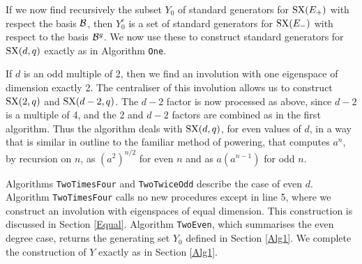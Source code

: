 \documentclass[12pt]{article}
\def\SX{{\rm SX}}
\begin{document}
If we now find recursively the subset $Y_0$ of
standard generators for $\SX(E_+)$ with respect the basis $\cal B$,
then $Y_0^c$ is a set of standard generators for $\SX(E_-)$ with
respect to the basis ${\cal B}^g$. We now use these 
to construct standard generators for 
$\SX(d,q)$ exactly as in Algorithm {\tt One}.

If $d$ is an odd multiple of 2, then we find an involution with one
eigenspace of dimension exactly 2. The centraliser of this
involution allows us to construct $\SX(2,q)$ and $\SX(d-2,q)$. The $d-2$
factor is now processed as above, since $d-2$ is a multiple of 4, and
the 2 and $d-2$ factors are combined as in the first algorithm. Thus
the algorithm deals with $\SX(d,q)$, for even  values of $d$, in a way
that is similar in outline to the familiar method of powering, that
computes $a^n$, by recursion on $n$, as $(a^2)^{n/2}$ for even $n$ and
as $a(a^{n-1})$ for odd $n$.

Algorithms {\tt TwoTimesFour} and {\tt TwoTwiceOdd} 
describe the case of even $d$. 
Algorithm {\tt TwoTimesFour} calls no new procedures except in line 5,
where we construct an involution with eigenspaces of equal dimension.
This construction is discussed in Section \ref{Equal}.
Algorithm {\tt TwoEven}, which summarises the even degree case,
returns the generating set $Y_0$ defined in Section \ref{Alg1}. 
We complete the construction of $Y$ exactly as in Section \ref{Alg1}.
\end{document}
